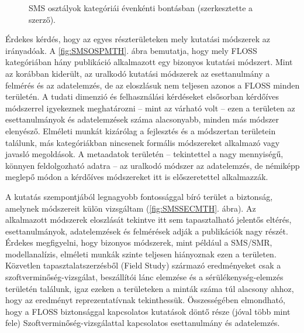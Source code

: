 \documentclass[12pt,magyar,a4paper,oneside]{scrreprt}
\begin{document}
\begin{figure}
\centering



\caption{SMS osztályok kategóriái évenkénti bontásban (szerkesztette a
szerző).}

\label{fig:SMSByYear}

\end{figure}

Érdekes kérdés, hogy az egyes részterületeken mely kutatási módszerek az
irányadóak. A \ref{fig:SMSOSPMTH}. ábra bemutatja, hogy mely FLOSS
kategóriában hány publikáció alkalmazott egy bizonyos kutatási módszert.
Mint az korábban kiderült, az uralkodó kutatási módszerek az
esettanulmány a felmérés és az adatelemzés, de az eloszlásuk nem
teljesen azonos a FLOSS minden területén. A tudati dimenzió és
felhasználási kérdéseket elsősorban kérdőíves módszerrel igyekeznek
meghatározni -- mint az várható volt -- ezen a területen az
esettanulmányok és adatelemzések száma alacsonyabb, minden más módszer
elenyésző. Elméleti munkát kizárólag a fejlesztés és a módszertan
területein találunk, más kategóriákban nincsenek formális módszereket
alkalmazó vagy javasló megoldások. A metaadatok területén -- tekintettel
a nagy mennyiségű, könnyen feldolgozható adatra -- az uralkodó módszer
az adatelemzés, de némiképp meglepő módon a kérdőíves módszereket itt is
előszeretettel alkalmazzák.

A kutatás szempontjából legnagyobb fontossággal bíró terület a
biztonság, amelynek módszereit külön vizsgáltam (\ref{fig:SMSSECMTH}.
ábra). Az alkalmazott módszerek eloszlását tekintve itt sem
tapasztalható jelentős eltérés, esettanulmányok, adatelemzések és
felmérések adják a publikációk nagy részét. Érdekes megfigyelni, hogy
bizonyos módszerek, mint például a SMS/SMR, modellanalízis, elméleti
munkák szinte teljesen hiányoznak ezen a területen. Közvetlen
tapasztalatszerzésből (Field Study) származó eredményeket csak a
szoftverminőség-vizsgálat, beszállítói lánc elemzése és a
sérülékenység-elemzés területén találunk, igaz ezeken a területeken a
minták száma túl alacsony ahhoz, hogy az eredményt reprezentatívnak
tekinthessük. Összességében elmondható, hogy a FLOSS biztonsággal
kapcsolatos kutatások döntő része (jóval több mint fele)
Szoftverminőség-vizsgálattal kapcsolatos esettanulmány és adatelemzés.
\end{document}
